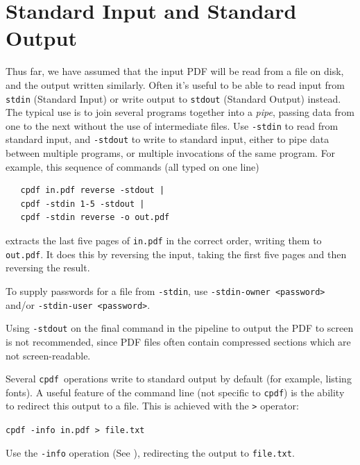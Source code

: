 \documentclass[a4paper,makeidx]{memoir}
\newcommand{\cpdf}{\texttt{cpdf}}
\begin{document}
  \section{Standard Input and Standard Output}
 
  Thus far, we have assumed that the input PDF will be read from a file on
disk, and the output written similarly. Often it's useful to be able to read
input from \texttt{stdin} (Standard Input) or write output to \texttt{stdout}
(Standard Output) instead. The typical use is to join several programs
together into a \textit{pipe}, passing data from one to the next without the
use of intermediate files. Use \texttt{-stdin} to read from standard input, and
\texttt{-stdout} to write to standard input, either to pipe data between
multiple programs, or multiple invocations of the same program. For example, this sequence of commands (all typed on one line)

  \begin{framed}
  \small\begin{verbatim}   cpdf in.pdf reverse -stdout |
   cpdf -stdin 1-5 -stdout |
   cpdf -stdin reverse -o out.pdf\end{verbatim}
  \end{framed}

\noindent extracts the last five pages of \texttt{in.pdf} in the correct order,
writing them to \texttt{out.pdf}. It does this by reversing the input, taking
the first five pages and then reversing the result.

To supply passwords for a file from \texttt{-stdin}, use \texttt{-stdin-owner <password>} and/or \texttt{-stdin-user <password>}.

Using \texttt{-stdout} on the final command in the pipeline to output the PDF
to screen is not recommended, since PDF files often contain compressed sections
which are not screen-readable.

Several \cpdf\ operations write to standard output by default (for
example, listing fonts). A useful feature of the command line (not specific to
\cpdf) is the ability to redirect this output to a file. This is
achieved with the \texttt{>} operator:

\begin{framed}
  \small\verb!cpdf -info in.pdf > file.txt!

  \vspace{2.5mm}
  \noindent Use the \texttt{-info} operation (See ), redirecting the
output to \texttt{file.txt}.
\end{framed}
\end{document}
